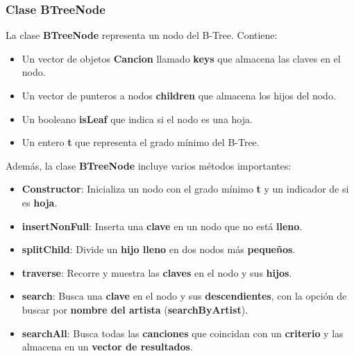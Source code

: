 \documentclass[corference]{IEEEtran}
\begin{document}
\begin{flushleft}
            \subsubsection{Clase BTreeNode}
                \noindent\hspace*{4em}La clase \textbf{BTreeNode} representa un nodo del B-Tree. Contiene:
                
                \begin{itemize}[left=4em]  %
                    \item Un vector de objetos \textbf{Cancion} llamado \textbf{keys} que almacena las claves en el nodo.
                    \item Un vector de punteros a nodos \textbf{children} que almacena los hijos del nodo.
                    \item Un booleano \textbf{isLeaf} que indica si el nodo es una hoja.
                    \item Un entero \textbf{t} que representa el grado mínimo del B-Tree.
                \end{itemize}
                
                \noindent\hspace*{4em}Además, la clase \textbf{BTreeNode} incluye varios métodos importantes:
                
                \begin{itemize}[left=4em]  %
                    \item \textbf{Constructor}: Inicializa un nodo con el grado mínimo \textbf{t} y un indicador de si es \textbf{hoja}.
                    \item \textbf{insertNonFull}: Inserta una \textbf{clave} en un nodo que no está \textbf{lleno}.
                    \item \textbf{splitChild}: Divide un \textbf{hijo lleno} en dos nodos más \textbf{pequeños}.
                    \item \textbf{traverse}: Recorre y muestra las \textbf{claves} en el nodo y sus \textbf{hijos}.
                    \item \textbf{search}: Busca una \textbf{clave} en el nodo y sus \textbf{descendientes}, con la opción de buscar por \textbf{nombre del artista} (\textbf{searchByArtist}).
                    \item \textbf{searchAll}: Busca todas las \textbf{canciones} que coincidan con un \textbf{criterio} y las almacena en un \textbf{vector de resultados}.
                \end{itemize}


\end{flushleft}
\end{document}
